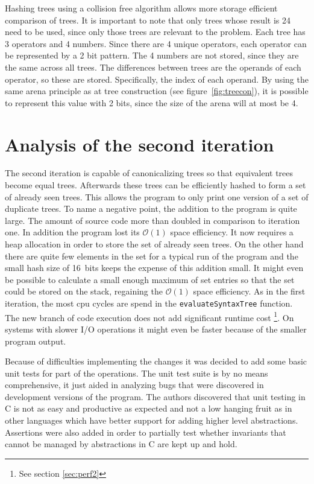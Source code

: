 \documentclass[11pt,a4paper]{article}
\newcommand{\code}[1]{\texttt{#1}}
\begin{document}
Hashing trees using a collision free algorithm allows more storage
efficient comparison of trees. 
It is important to note that only trees whose result is 24 need to be used, 
since only those trees are relevant to the problem.
Each tree has 3 operators and 4 numbers. Since there are 4 unique operators, 
each operator can be represented by a 2 bit pattern. 
The 4 numbers are not stored, since they are the same across all trees. 
The differences between trees are the operands of each operator, so these are stored. 
Specifically, the index of each operand. 
By using the same arena principle as at tree construction (see figure~\ref{fig:treecon}), it is 
possible to represent this value with 2 bits, since the size of the arena will at most be 4. 

\section{Analysis of the second iteration}
\label{sec:ana2}

The second iteration is capable of canonicalizing trees so that
equivalent trees become equal trees.
Afterwards these trees can be efficiently hashed to form a set of
already seen trees.
This allows the program to only print one version of a set of
duplicate trees.
To name a negative point, the addition to the program is quite large.
The amount of source code more than doubled in comparison to iteration
one.
In addition the program lost its $\mathcal{O}(1)$ space efficiency.
It now requires a heap allocation in order to store the set of already
seen trees.
On the other hand there are quite few elements in the set for a
typical run of the program and the small hash size of 16~bits keeps
the expense of this addition small.
It might even be possible to calculate a small enough maximum of set
entries so that the set could be stored on the stack, regaining the
$\mathcal{O}(1)$ space efficiency.
As in the first iteration, the most cpu cycles are spend in the
\code{evaluateSyntaxTree} function.
The new branch of code execution does not add significant runtime
cost \footnote{See section \ref{sec:perf2}}.
On systems with slower I/O operations it might even be faster because
of the smaller program output.

Because of difficulties implementing the changes it was decided to add
some basic unit tests for part of the operations. The unit test suite
is by no means comprehensive, it just aided in analyzing bugs that
were discovered in development versions of the program.
The authors discovered that unit testing in C is not as easy and
productive as expected and not a low hanging fruit as in other
languages which have better support for adding higher level
abstractions.
Assertions were also added in order to partially test whether
invariants that cannot be managed by abstractions in C are kept up and
hold.
\end{document}

